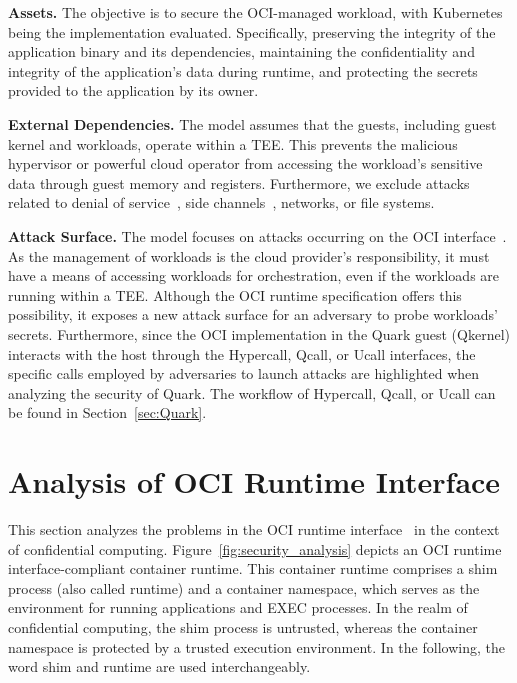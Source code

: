 \textbf{Assets.} The objective is to secure the OCI-managed workload, with Kubernetes being the implementation evaluated. Specifically, preserving the integrity of the application binary and its dependencies, maintaining the confidentiality and integrity of the application’s data during runtime, and protecting the secrets 
provided to the application by its owner.

\textbf{External Dependencies.} The model assumes that the guests, including guest kernel and workloads, operate within a \acrshort{TEE}. This prevents the malicious hypervisor or powerful cloud operator from accessing the workload’s sensitive data through guest memory and registers. Furthermore, we exclude attacks related to 
denial of service~\cite*{DOS_ATTACK}, side channels~\cite*{217454}, networks, or file systems.

\textbf{Attack Surface.} The model focuses on attacks occurring on the OCI interface~\cite*{oci-runtime-spec}. As the management of workloads is the cloud provider’s responsibility, it must have a means of accessing workloads for orchestration, even if the workloads are running within a TEE. Although the OCI runtime specification offers this possibility, 
it exposes a new attack surface for an adversary to probe workloads’ secrets. Furthermore, since the OCI implementation in the Quark guest (Qkernel) interacts with the host through the Hypercall, Qcall, or Ucall interfaces, the specific calls employed by adversaries to launch  attacks are highlighted when analyzing the security of Quark.
The workflow of Hypercall, Qcall, or Ucall can be found in Section~\ref{sec:Quark}.



\section{Analysis of OCI Runtime Interface}
\label{sec:security_analyse_oci_analysis}
This section analyzes the problems in the OCI runtime interface~\cite*{oci-runtime-spec} in the context of confidential computing.  Figure~\ref{fig:security_analysis} depicts an OCI  runtime interface-compliant container runtime. This container runtime comprises a shim process (also called runtime) and a container namespace, which serves as the environment for running applications and EXEC processes. In the realm of confidential computing, the shim process is untrusted, whereas the container namespace is protected by a 
trusted execution environment. In the following, the word shim and runtime are used interchangeably.


